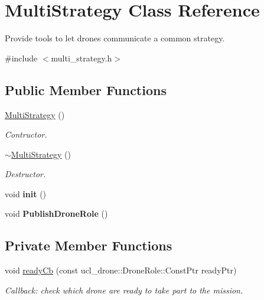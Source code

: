 \hypertarget{classMultiStrategy}{}\section{Multi\+Strategy Class Reference}
\label{classMultiStrategy}


Provide tools to let drones communicate a common strategy.  




{\ttfamily \#include $<$multi\+\_\+strategy.\+h$>$}

\subsection*{Public Member Functions}
\begin{DoxyCompactItemize}
\item 
\mbox{\label{classMultiStrategy_a0a36ce25f1d4fb7b44c792c4f67b8f4c}} 
\hyperlink{classMultiStrategy_a0a36ce25f1d4fb7b44c792c4f67b8f4c}{Multi\+Strategy} ()
\begin{DoxyCompactList}\small\item\em Contructor. \end{DoxyCompactList}\item 
\mbox{\label{classMultiStrategy_a5b2657a08fb1c5a1f38dec9a855055d3}} 
\hyperlink{classMultiStrategy_a5b2657a08fb1c5a1f38dec9a855055d3}{$\sim$\+Multi\+Strategy} ()
\begin{DoxyCompactList}\small\item\em Destructor. \end{DoxyCompactList}\item 
\mbox{\label{classMultiStrategy_a34ec173b53387fea1757bdafaa52c7c9}} 
void {\bfseries init} ()
\item 
\mbox{\label{classMultiStrategy_a9c4a794972baf798f70cdbc861ab87b2}} 
void {\bfseries Publish\+Drone\+Role} ()
\end{DoxyCompactItemize}
\subsection*{Private Member Functions}
\begin{DoxyCompactItemize}
\item 
\mbox{\label{classMultiStrategy_afd108771c02167ba6bcee890d332a94e}} 
void \hyperlink{classMultiStrategy_afd108771c02167ba6bcee890d332a94e}{ready\+Cb} (const ucl\+\_\+drone\+::\+Drone\+Role\+::\+Const\+Ptr ready\+Ptr)
\begin{DoxyCompactList}\small\item\em Callback\+: check which drone are ready to take part to the mission. \end{DoxyCompactList}\end{DoxyCompactItemize}
